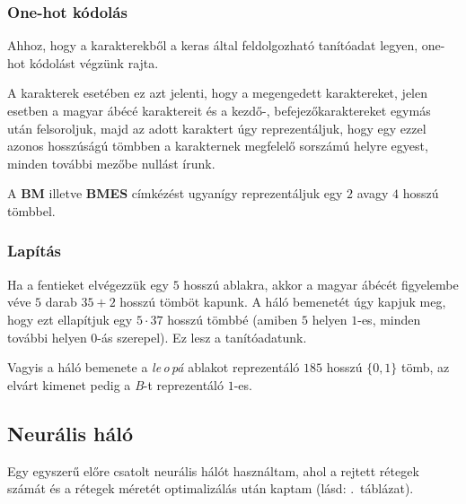 \documentclass[a4paper, magyar]{article}
\newcommand{\tabref}[1]{\aref{#1}.~táblázat}
\begin{document}
\subsubsection{One-hot kódolás}

Ahhoz, hogy a karakterekből a keras által feldolgozható tanítóadat legyen, one-hot kódolást végzünk rajta. 

A karakterek esetében ez azt jelenti, hogy a megengedett karaktereket, jelen esetben a magyar ábécé karaktereit és a kezdő-, befejezőkaraktereket egymás után felsoroljuk, majd az adott karaktert úgy reprezentáljuk, hogy egy ezzel azonos hosszúságú tömbben a karakternek megfelelő sorszámú helyre egyest, minden további mezőbe nullást írunk.

A \textbf{BM} illetve \textbf{BMES} címkézést ugyanígy reprezentáljuk egy $2$ avagy $4$ hosszú tömbbel. 

\subsubsection{Lapítás}

Ha a fentieket elvégezzük egy $5$ hosszú ablakra, akkor a magyar ábécét figyelembe véve $5$ darab $35+2$ hosszú tömböt kapunk. A háló bemenetét úgy kapjuk meg, hogy ezt ellapítjuk egy $5\cdot37$ hosszú tömbbé (amiben $5$ helyen $1$-es, minden további helyen $0$-ás szerepel). Ez lesz a tanítóadatunk.

Vagyis a háló bemenete a \textit{le\,o\,pá} ablakot reprezentáló $185$ hosszú $\{0,1\}$ tömb, az elvárt kimenet pedig a \textit{B}-t reprezentáló $1$-es.
\subsection{Neurális háló}
Egy egyszerű előre csatolt neurális hálót használtam, ahol a rejtett rétegek számát és a rétegek méretét optimalizálás után kaptam (lásd: \tabref{tab:optim}).
\end{document}
